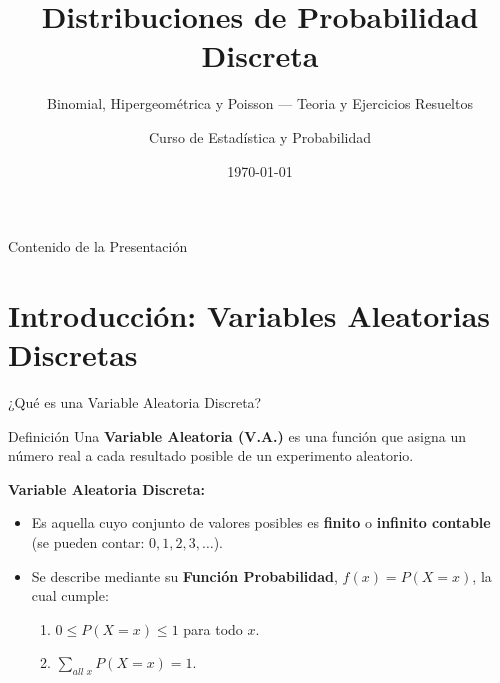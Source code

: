 \documentclass[aspectratio=169, 10pt]{beamer}
\title[Probabilidad Discreta]{Distribuciones de Probabilidad Discreta}
\subtitle{Binomial, Hipergeométrica y Poisson — Teoria y Ejercicios Resueltos}
\author{Curso de Estadística y Probabilidad}
\date{\today}
\begin{document}
\begin{frame}
    \titlepage
\end{frame}

\begin{frame}{Contenido de la Presentación}
    \tableofcontents
\end{frame}


\section{Introducción: Variables Aleatorias Discretas}

\begin{frame}{¿Qué es una Variable Aleatoria Discreta?}
    \begin{block}{Definición}
        Una \textbf{Variable Aleatoria (V.A.)} es una función que asigna un número real a cada resultado posible de un experimento aleatorio.
    \end{block}

    \vspace{0.3cm}
    \textbf{Variable Aleatoria Discreta:}
    \begin{itemize} 
        \item Es aquella cuyo conjunto de valores posibles es \textbf{finito} o \textbf{infinito contable} (se pueden contar: $0, 1, 2, 3, \dots$).
        \item Se describe mediante su \textbf{Función Probabilidad}, $f(x) = P(X = x)$, la cual cumple:
        \begin{enumerate}
            \item $0 \le P(X = x) \le 1$ para todo $x$.
            \item $\sum_{all \; x} P(X = x) = 1$.
        \end{enumerate}
    \end{itemize}
\end{frame}
\end{document}
